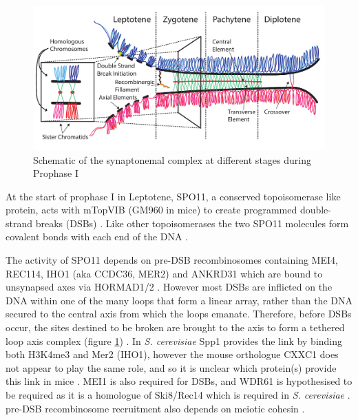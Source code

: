 \begin{figure}[H]
	\centering
	\includegraphics[width=\textwidth]{figures/intro/synaptonemal_complex.pdf}
	\caption[Synaptonemal Complex]{Schematic of the synaptonemal complex at different stages during Prophase I~\parencite[based on ][]{Gaysinskaya2018MOESM1, Gaysinskaya2018Transient, Cohen2010Predicting, Bolcun-Filas2012Chapter, Hughes2018Female, Cahoon2017Superresolution}}
	\label{fig:synaptonemal_complex}
\end{figure}

At the start of prophase I in Leptotene, SPO11, a conserved topoisomerase like protein, acts with mTopVIB (GM960 in mice) to create programmed double-strand breaks (DSBs) \parencite{Sun1989Doublestrand, Keeney1997MeiosisSpecific, Bergerat1997atypical, Cole2012Homeostatic, Vrielynck2016DNA, Robert2016TopoVIBLike, Li2019highresolution}.
Like other topoisomerases the two SPO11 molecules form covalent bonds with each end of the DNA \parencite{Neale2005Endonucleolytic}.

The activity of SPO11 depends on pre-DSB recombinosomes containing MEI4, REC114, IHO1 (aka CCDC36, MER2) and ANKRD31 which are bound to unsynapsed axes via HORMAD1/2 \parencite{Kumar2010Functional,Panizza2011Spo11Accessory, Stanzione2016Meiotic, Kumar2018Mouse, Papanikos2019Mouse, Boekhout2019REC114}.
However most DSBs are inflicted on the DNA within one of the many loops that form a linear array, rather than the DNA secured to the central axis from which the loops emanate.
Therefore, before DSBs occur, the sites destined to be broken are brought to the axis to form a tethered loop axis complex (figure \ref{fig:synaptonemal_complex}) \parencite{Blat2002Physical,Panizza2011Spo11Accessory}.
In \textit{S. cerevisiae} Spp1 provides the link by binding both H3K4me3 and Mer2 (IHO1), however the mouse orthologue CXXC1 does not appear to play the same role, and so it is unclear which protein(s) provide this link in mice \parencite{Acquaviva2013COMPASS,Sommermeyer2013Spp1,Tian2018CXXC1}.
MEI1 is also required for DSBs, and WDR61 is hypothesised to be required as it is a homologue of Ski8/Rec14 which is required in \textit{S. cerevisiae} \parencite[reviewed in][]{Kumar2010Initiation, Lam2015Mechanism}.
pre-DSB recombinosome recruitment also depends on meiotic cohesin \parencite{Bhattacharyya2019Prdm9}.

